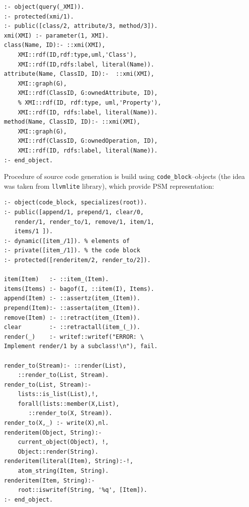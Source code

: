 \documentclass[conference]{IEEEtran}
\begin{document}
\begin{multicols}{2}
\begin{verbatim}
:- object(query(_XMI)).
:- protected(xmi/1).
:- public([class/2, attribute/3, method/3]).
xmi(XMI) :- parameter(1, XMI).
class(Name, ID):- ::xmi(XMI),
    XMI::rdf(ID,rdf:type,uml,'Class'),
    XMI::rdf(ID,rdfs:label, literal(Name)).
attribute(Name, ClassID, ID):-  ::xmi(XMI),
    XMI::graph(G),
    XMI::rdf(ClassID, G:ownedAttribute, ID),
    % XMI::rdf(ID, rdf:type, uml,'Property'),
    XMI::rdf(ID, rdfs:label, literal(Name)).
method(Name, ClassID, ID):- ::xmi(XMI),
    XMI::graph(G),
    XMI::rdf(ClassID, G:ownedOperation, ID),
    XMI::rdf(ID, rdfs:label, literal(Name)).
:- end_object.
\end{verbatim}
\end{multicols}

Procedure of source code generation is build using \verb|code_block|--objects (the idea was taken from \verb|llvmlite| library), which provide PSM representation:

\begin{multicols}{2}
\begin{verbatim}
:- object(code_block, specializes(root)).
:- public([append/1, prepend/1, clear/0,
   render/1, render_to/1, remove/1, item/1,
   items/1 ]).
:- dynamic([item_/1]). % elements of
:- private([item_/1]). % the code block
:- protected([renderitem/2, render_to/2]).

item(Item)   :- ::item_(Item).
items(Items) :- bagof(I, ::item(I), Items).
append(Item) :- ::assertz(item_(Item)).
prepend(Item):- ::asserta(item_(Item)).
remove(Item) :- ::retract(item_(Item)).
clear        :- ::retractall(item_(_)).
render(_)    :- writef::writef("ERROR: \
Implement render/1 by a subclass!\n"), fail.

render_to(Stream):- ::render(List),
    ::render_to(List, Stream).
render_to(List, Stream):-
    lists::is_list(List),!,
    forall(lists::member(X,List),
       ::render_to(X, Stream)).
render_to(X,_) :- write(X),nl.
renderitem(Object, String):-
    current_object(Object), !,
    Object::render(String).
renderitem(literal(Item), String):-!,
    atom_string(Item, String).
renderitem(Item, String):-
    root::iswritef(String, '%q', [Item]).
:- end_object.
\end{verbatim}
\end{multicols}
\end{document}
